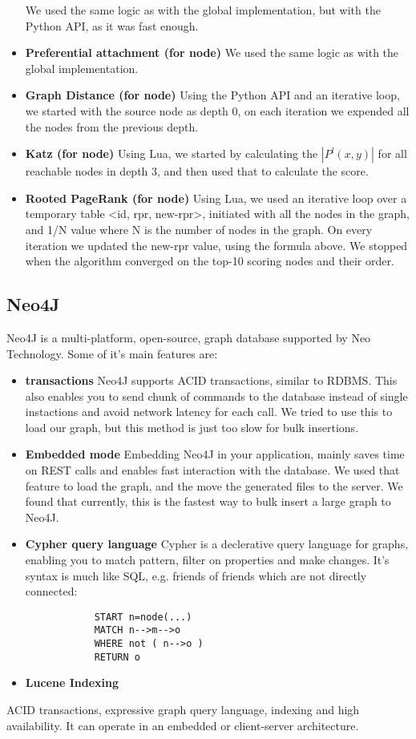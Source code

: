 \begin{itemize}
        We used the same logic as with the global implementation, but with the Python API,
        as it was fast enough.
	\item {\bf Preferential attachment (for node)}
        We used the same logic as with the global implementation.
	\item {\bf Graph Distance (for node)}
        Using the Python API and an iterative loop, we started with the source node 
        as depth 0, on each iteration we expended all the nodes from the previous depth.
	\item {\bf Katz (for node)}
        Using Lua, we started by calculating the $|P^l(x,y)|$ for all reachable nodes in depth 3,
        and then used that to calculate the score.
	\item {\bf Rooted PageRank (for node)}
        Using Lua, we used an iterative loop over a temporary table <id, rpr, new-rpr>, initiated with all the 
        nodes in the graph, and 1/N value where N is the number of nodes in the graph. On every 
        iteration we updated the new-rpr value, using the formula above. We stopped when the algorithm
        converged on the top-10 scoring nodes and their order.
\end{itemize}

\subsection{Neo4J}
Neo4J is a multi-platform, open-source, graph database supported by Neo
Technology. Some of it's main features are:
\begin{itemize}
    \item {\bf transactions}
        Neo4J supports ACID transactions, similar to RDBMS. This also enables 
        you to send chunk of commands to the database instead of single 
        instactions and avoid network latency for each call. We tried to use
        this to load our graph, but this method is just too slow for bulk insertions.
    \item {\bf Embedded mode}
        Embedding Neo4J in your application, mainly saves time on REST calls 
        and enables fast interaction with the database. We used that feature 
        to load the graph, and the move the generated files to the server.
        We found that currently, this is the fastest way to bulk insert a 
        large graph to Neo4J.
    \item {\bf Cypher query language}
        Cypher is a declerative query language for graphs, enabling you to
        match pattern, filter on properties and make changes. It's syntax is
        much like SQL, e.g. friends of friends which are not directly connected:
        \begin{verbatim}
            START n=node(...)
            MATCH n-->m-->o
            WHERE not ( n-->o )
            RETURN o
        \end{verbatim}
    \item {\bf Lucene Indexing}
\end{itemize}
ACID transactions, expressive graph query
language, indexing and high availability. It can operate in an embedded or
client-server architecture. 

